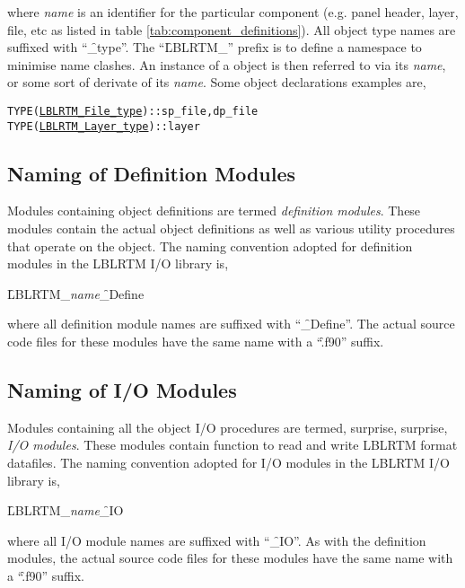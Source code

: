 where \textit{name} is an identifier for the particular component (e.g. panel header, layer, file, etc as listed in table \ref{tab:component_definitions}). All object type names are suffixed with ``\f{\_type}''. The ``\f{LBLRTM\_}'' prefix is to define a namespace to minimise name clashes. An instance of a object is then referred to via its \textit{name}, or some sort of derivate of its \textit{name}. Some object declarations examples are,

\begin{alltt}
  TYPE(\hyperref[fig:LBLRTM_File_type_structure]{LBLRTM_File_type}) :: sp_file, dp_file
  TYPE(\hyperref[fig:LBLRTM_Layer_type_structure]{LBLRTM_Layer_type}) :: layer\end{alltt}



\subsection{Naming of Definition Modules}

Modules containing object definitions are termed \textit{definition modules}. These modules contain the actual object definitions as well as various utility procedures that operate on the object. The naming convention adopted for definition modules in the LBLRTM I/O library is, 

\hspace{0.4cm}\f{LBLRTM\_}\textit{name}\f{\_Define} 

where all definition module names are suffixed with ``\f{\_Define}''. The actual source code files for these modules have the same name with a ``\f{.f90}'' suffix.



\subsection{Naming of I/O Modules}

Modules containing all the object I/O procedures are termed, surprise, surprise, \textit{I/O modules}. These modules contain function to read and write LBLRTM format datafiles. The naming convention adopted for I/O modules in the LBLRTM I/O library is, 

\hspace{0.4cm}\f{LBLRTM\_}\textit{name}\f{\_IO} 

where all I/O module names are suffixed with ``\f{\_IO}''. As with the definition modules, the actual source code files for these modules have the same name with a ``\f{.f90}'' suffix.



